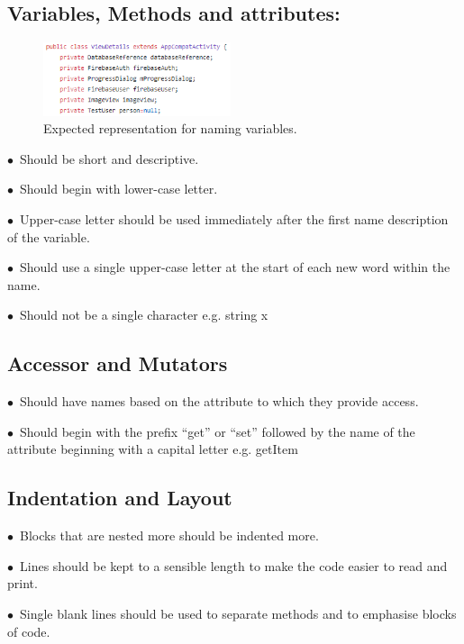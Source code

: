 \documentclass[english]{article}
\begin{document}
		\subsection{Variables, Methods and attributes:}
		\begin{figure}
			\caption{Expected representation for naming variables.}\label{wrap-fig:1}
			\includegraphics[width=5.5cm]{images/variables.png}
		\end{figure} 
			$\bullet$\ Should be short and descriptive.\par
			$\bullet$\ Should begin with lower-case letter.\par
$\bullet$\ Upper-case letter should be used immediately after the first name description of the variable.\par
$\bullet$\ Should use a single upper-case letter at the start of each new word within the name.\par
$\bullet$\ Should not be a single character e.g. string x  \par


                                	

		\subsection{Accessor and Mutators}
$\bullet$\  Should have names based on the attribute to which they provide access.\par
$\bullet$\ Should begin with the prefix “get” or “set” followed by the name of the attribute beginning with a capital letter e.g. getItem \par
				
		\subsection{Indentation and Layout}
		$\bullet$\ Blocks that are nested more should be indented more. \par
		
$\bullet$\ Lines should be kept to a sensible length to make the code easier to read and print.\par	
	$\bullet$\ Single blank lines should be used to separate methods and to emphasise blocks of code.\par	
		
\end{document}
